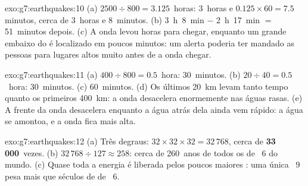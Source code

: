 \begin{solution}{exo:g7:earthquakes:10}
(a) $2500 \div 800 = 3.125$~horas: 3~horas e $0.125 \times 60 = 7.5$
minutos, cerca de 3~horas e 8~minutos. (b) 3~h~8~min $-$ 2~h~17~min $=$
51~minutos depois. (c) A onda levou horas para chegar, enquanto um grande
 embaixo do  é localizado em poucos minutos: um alerta
poderia ter mandado as pessoas para lugares altos muito antes de a onda
chegar.
\end{solution}

\begin{solution}{exo:g7:earthquakes:11}
(a) $400 \div 800 = 0.5$~hora: 30~minutos. (b) $20 \div 40 = 0.5$~hora:
30~minutos. (c) 60~minutos. (d) Os últimos \qty{20}{km} levam tanto tempo
quanto os primeiros \qty{400}{km}: a onda desacelera enormemente nas
águas rasas. (e) A frente da onda desacelera enquanto a água atrás dela
ainda vem rápido: a água se amontoa, e a onda fica mais alta.
\end{solution}

\begin{solution}{exo:g7:earthquakes:12}
(a) Três degraus: $32 \times 32 \times 32 = 32\,768$, cerca de
\textbf{33\,000}~vezes. (b) $32\,768 \div 127 \approx 258$: cerca de
260~anos de todos os  de ~6 do mundo. (c) Quase toda a
energia é liberada pelos poucos maiores : uma única ~9
pesa mais que séculos de  de ~6.
\end{solution}

